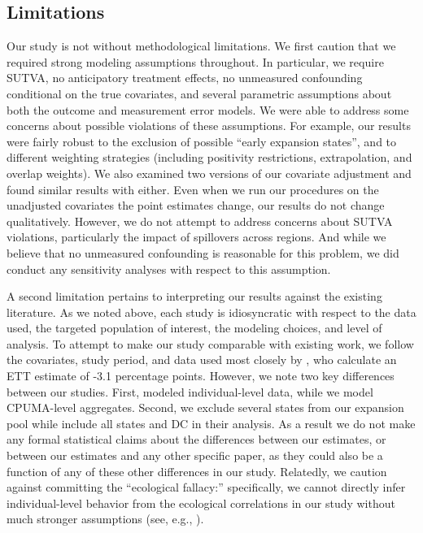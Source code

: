 \subsection{Limitations}

Our study is not without methodological limitations. We first caution that we required strong modeling assumptions throughout. In particular, we require SUTVA, no anticipatory treatment effects, no unmeasured confounding conditional on the true covariates, and several parametric assumptions about both the outcome and measurement error models. We were able to address some concerns about possible violations of these assumptions. For example, our results were fairly robust to the exclusion of possible ``early expansion states'', and to different weighting strategies (including positivity restrictions, extrapolation, and overlap weights). We also examined two versions of our covariate adjustment and found similar results with either. Even when we run our procedures on the unadjusted covariates the point estimates change, our results do not change qualitatively. However, we do not attempt to address concerns about SUTVA violations, particularly the impact of spillovers across regions. And while we believe that no unmeasured confounding is reasonable for this problem, we did conduct any sensitivity analyses with respect to this assumption.

A second limitation pertains to interpreting our results against the existing literature. As we noted above, each study is idiosyncratic with respect to the data used, the targeted population of interest, the modeling choices, and level of analysis. To attempt to make our study comparable with existing work, we follow the covariates, study period, and data used most closely by \cite{courtemanche2017early}, who calculate an ETT estimate of -3.1 percentage points. However, we note two key differences between our studies. First, \cite{courtemanche2017early} modeled individual-level data, while we model CPUMA-level aggregates. Second, we exclude several states from our expansion pool while \cite{courtemanche2017early} include all states and DC in their analysis. As a result we do not make any formal statistical claims about the differences between our estimates, or between our estimates and any other specific paper, as they could also be a function of any of these other differences in our study. Relatedly, we caution against committing the ``ecological fallacy:'' specifically, we cannot directly infer individual-level behavior from the ecological correlations in our study without much stronger assumptions (see, e.g., \cite{subramanian2009revisiting}).

